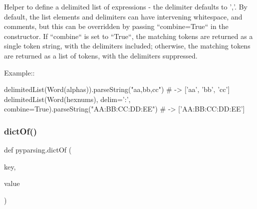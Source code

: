 \begin{DoxyVerb}Helper to define a delimited list of expressions - the delimiter
defaults to ','. By default, the list elements and delimiters can
have intervening whitespace, and comments, but this can be
overridden by passing ``combine=True`` in the constructor. If
``combine`` is set to ``True``, the matching tokens are
returned as a single token string, with the delimiters included;
otherwise, the matching tokens are returned as a list of tokens,
with the delimiters suppressed.

Example::

    delimitedList(Word(alphas)).parseString("aa,bb,cc") # -> ['aa', 'bb', 'cc']
    delimitedList(Word(hexnums), delim=':', combine=True).parseString("AA:BB:CC:DD:EE") # -> ['AA:BB:CC:DD:EE']
\end{DoxyVerb}
 \mbox{\label{namespacepyparsing_a1ca11345ac006d9374c42fdd3205e0e6}} 
\subsubsection{\texorpdfstring{dict\+Of()}{dictOf()}}
{\footnotesize\ttfamily def pyparsing.\+dict\+Of (\begin{DoxyParamCaption}\item[{}]{key,  }\item[{}]{value }\end{DoxyParamCaption})}

